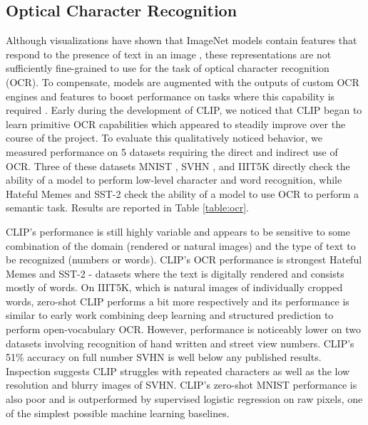 \documentclass{article}
\begin{document}
\subsection{Optical Character Recognition}

Although visualizations have shown that ImageNet models contain features that respond to the presence of text in an image \citep{zeiler2014visualizing}, these representations are not sufficiently fine-grained to use for the task of optical character recognition (OCR). To compensate, models are augmented with the outputs of custom OCR engines and features to boost performance on tasks where this capability is required \citep{singh2019towards,yang2020tap}. Early during the development of CLIP, we noticed that CLIP began to learn primitive OCR capabilities which appeared to steadily improve over the course of the project. To evaluate this qualitatively noticed behavior, we measured performance on 5 datasets requiring the direct and indirect use of OCR. Three of these datasets MNIST \citep{lecun1998mnist}, SVHN \citep{netzer2011reading}, and IIIT5K \citep{mishra2012scene} directly check the ability of a model to perform low-level character and word recognition, while Hateful Memes \citep{kiela2020hateful} and SST-2 \citep{socher2013recursive} check the ability of a model to use OCR to perform a semantic task. Results are reported in Table \ref{table:ocr}. 

CLIP's performance is still highly variable and appears to be sensitive to some combination of the domain (rendered or natural images) and the type of text to be recognized (numbers or words). CLIP's OCR performance is strongest Hateful Memes and SST-2 - datasets where the text is digitally rendered and consists mostly of words. On IIIT5K, which is natural images of individually cropped words, zero-shot CLIP performs a bit more respectively and its performance is similar to \citet{jaderberg2014deep} early work combining deep learning and structured prediction to perform open-vocabulary OCR. However, performance is noticeably lower on two datasets involving recognition of hand written and street view numbers. CLIP's 51\% accuracy on full number SVHN is well below any published results. Inspection suggests CLIP struggles with repeated characters as well as the low resolution and blurry images of SVHN. CLIP's zero-shot MNIST performance is also poor and is outperformed by supervised logistic regression on raw pixels, one of the simplest possible machine learning baselines.
\end{document}

